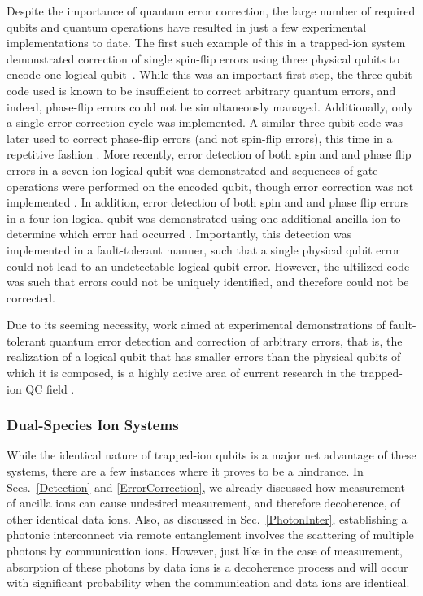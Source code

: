 \documentclass[%
12pt,
 amsmath,amssymb,
]{revtex4-2}
\begin{document}
Despite the importance of quantum error correction, the large number of required qubits and quantum operations have resulted in just a few experimental implementations to date.  The first such example of this in a trapped-ion system demonstrated correction of single spin-flip errors using three physical qubits to encode one logical qubit~\cite{ChiaveriniQEC2004}.  While this was an important first step, the three qubit code used is known to be insufficient to correct arbitrary quantum errors, and indeed, phase-flip errors could not be simultaneously managed.  Additionally, only a single error correction cycle was implemented.  A similar three-qubit code was later used to correct phase-flip errors (and not spin-flip errors), this time in a repetitive fashion \cite{SchindlerQEC2004}.  More recently, error detection of both spin and and phase flip errors in a seven-ion logical qubit was demonstrated and sequences of gate operations were performed on the encoded qubit, though error correction was not implemented \cite{NiggQED2014}.  In addition, error detection of both spin and and phase flip errors in a four-ion logical qubit was demonstrated using one additional ancilla ion to determine which error had occurred \cite{LinkeErrorDetection2017}.  Importantly, this detection was implemented in a fault-tolerant manner, such that a single physical qubit error could not lead to an undetectable logical qubit error.  However, the ultilized code was such that errors could not be uniquely identified, and therefore could not be corrected.

Due to  its seeming necessity, work aimed at experimental demonstrations of fault-tolerant quantum error detection and correction of arbitrary errors, that is, the realization of a logical qubit that has smaller errors than the physical qubits of which it is composed, is a highly active area of current research in the trapped-ion QC field \cite{BermudezAssessing2017, TroutSurfaceCodeSim2018}.

   \subsubsection{Dual-Species Ion Systems}
   \label{DualSpecies}
While the identical nature of trapped-ion qubits is a major net advantage of these systems, there are a few instances where it proves to be a hindrance.  In Secs.~\ref{Detection} and \ref{ErrorCorrection}, we already discussed how measurement of ancilla ions can cause undesired measurement, and therefore decoherence, of other identical data ions.  Also, as discussed in Sec.~\ref{PhotonInter}, establishing a photonic interconnect via remote entanglement involves the scattering of multiple photons by communication ions.  However, just like in the case of measurement, absorption of these photons by data ions is a decoherence process and will occur with significant probability when the communication and data ions are identical.
\end{document}
